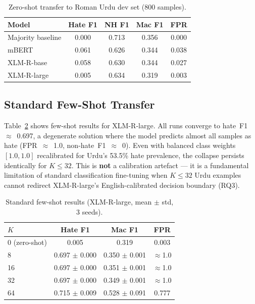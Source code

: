 \documentclass{article}
\begin{document}
\begin{table}[h]
\centering
\caption{Zero-shot transfer to Roman Urdu dev set (800 samples).}
\label{tab:zs_results}
\vskip 0.05in
\begin{small}
\begin{tabular}{lcccc}
\toprule
Model & Hate F1 & NH F1 & Mac F1 & FPR \\
\midrule
Majority baseline  & 0.000 & 0.713 & 0.356 & 0.000 \\
mBERT              & 0.061 & 0.626 & 0.344 & 0.038 \\
XLM-R-base         & 0.058 & 0.630 & 0.344 & 0.027 \\
XLM-R-large        & 0.005 & 0.634 & 0.319 & 0.003 \\
\bottomrule
\end{tabular}
\end{small}
\end{table}

\subsection{Standard Few-Shot Transfer}

Table~\ref{tab:fs_results} shows few-shot results for XLM-R-large.
All runs converge to hate~F1~$\approx$~0.697, a degenerate solution where the
model predicts almost all samples as hate (FPR~$\approx$~1.0, non-hate~F1~$\approx$~0).
Even with balanced class weights $[1.0, 1.0]$ recalibrated for Urdu's
53.5\% hate prevalence, the collapse persists identically for $K \le 32$.
This is \textbf{not} a calibration artefact --- it is a fundamental limitation of
standard classification fine-tuning when $K \le 32$ Urdu examples cannot redirect
XLM-R-large's English-calibrated decision boundary (RQ3).

\begin{table}[h]
\centering
\caption{Standard few-shot results (XLM-R-large, mean $\pm$ std, 3 seeds).}
\label{tab:fs_results}
\vskip 0.05in
\begin{small}
\begin{tabular}{lccc}
\toprule
$K$ & Hate F1 & Mac F1 & FPR \\
\midrule
0 (zero-shot) & 0.005          & 0.319          & 0.003 \\
8             & 0.697 $\pm$ 0.000 & 0.350 $\pm$ 0.001 & $\approx$1.0 \\
16            & 0.697 $\pm$ 0.000 & 0.351 $\pm$ 0.001 & $\approx$1.0 \\
32            & 0.697 $\pm$ 0.000 & 0.349 $\pm$ 0.001 & $\approx$1.0 \\
64            & 0.715 $\pm$ 0.009 & 0.528 $\pm$ 0.091 & 0.777 \\
\bottomrule
\end{tabular}
\end{small}
\end{table}
\end{document}
